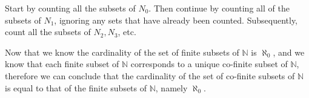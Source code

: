 \documentclass[fleqn]{article}
\begin{document}
\begin{enumerate}
\begin{enumerate}
		Start by counting all the subsets of \(N_0\). Then continue by counting all of the subsets of \(N_1\), ignoring any sets that have already been counted. Subsequently, count all the subsets of \(N_2, N_3\), etc.
		
		Now that we know the cardinality of the set of finite subsets of \(\mathbb{N}\) is \(\aleph_0\), and we know that each finite subset of \(\mathbb{N}\) corresponds to a unique co-finite subset of \(\mathbb{N}\), therefore we can conclude that the cardinality of the set of co-finite subsets of \(\mathbb{N}\) is equal to that of the finite subsets of \(\mathbb{N}\), namely \(\aleph_0\).
	\end{enumerate}

\end{enumerate}
	
\end{document}

